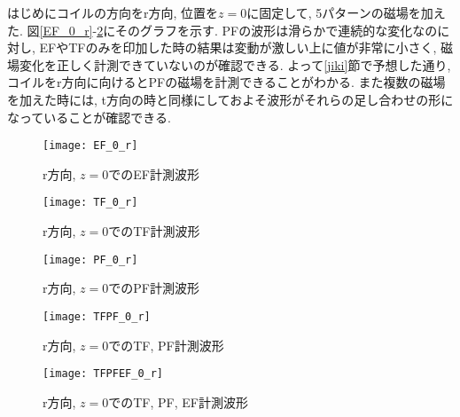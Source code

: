 \documentclass[]{jsarticle}
\begin{document}
		はじめにコイルの方向をr方向, 位置を$z = 0$に固定して, 5パターンの磁場を加えた. 図\ref{EF_0_r}-\ref{TFPFEF_0_r}にそのグラフを示す. PFの波形は滑らかで連続的な変化なのに対し, EFやTFのみを印加した時の結果は変動が激しい上に値が非常に小さく, 磁場変化を正しく計測できていないのが確認できる. よって\ref{jiki}節で予想した通り, コイルをr方向に向けるとPFの磁場を計測できることがわかる. また複数の磁場を加えた時には, t方向の時と同様にしておよそ波形がそれらの足し合わせの形になっていることが確認できる. 
		
		\begin{figure}[htbp]
	
		\begin{minipage}{0.33\hsize}
			\begin{center}
				\texttt{[image: EF\_0\_r]}
				\caption{r方向, $z = 0$でのEF計測波形}
				\label{EF_0_r}
			\end{center}
		\end{minipage}
		\begin{minipage}{0.33\hsize}
			\begin{center}
				\texttt{[image: TF\_0\_r]}
				\caption{r方向, $z = 0$でのTF計測波形}
				\label{TF_0_r}
			\end{center}
		\end{minipage}
		\begin{minipage}{0.33\hsize}
			\begin{center}
				\texttt{[image: PF\_0\_r]}
				\caption{r方向, $z = 0$でのPF計測波形}
				\label{PF_0_r}
			\end{center}
		\end{minipage}
		
		\end{figure}
		
		\begin{figure}[htbp]
		\begin{minipage}{0.5\hsize}
			\begin{center}
				\texttt{[image: TFPF\_0\_r]}
				\caption{r方向, $z = 0$でのTF, PF計測波形}
				\label{TFPF_0_r}
			\end{center}
		\end{minipage}
		\begin{minipage}{0.5\hsize}
			\begin{center}
				\texttt{[image: TFPFEF\_0\_r]}
				\caption{r方向, $z = 0$でのTF, PF, EF計測波形}
				\label{TFPFEF_0_r}
			\end{center}
		\end{minipage}
	\end{figure}
\end{document}
